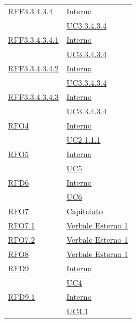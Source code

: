 \begin{longtable}{|>{\centering}m{5cm}|m{5cm}<{\centering}|}
\hyperlink{RFF3.3.4.3.4}{RFF3.3.4.3.4} & \hyperlink{Interno}{Interno}\\
& \hyperref[UC3.3.4.3.4]{UC3.3.4.3.4}\\ \hline

\hyperlink{RFF3.3.4.3.4.1}{RFF3.3.4.3.4.1} & \hyperlink{Interno}{Interno}\\
& \hyperref[UC3.3.4.3.4]{UC3.3.4.3.4}\\ \hline

\hyperlink{RFF3.3.4.3.4.2}{RFF3.3.4.3.4.2} & \hyperlink{Interno}{Interno}\\
& \hyperref[UC3.3.4.3.4]{UC3.3.4.3.4}\\ \hline

\hyperlink{RFF3.3.4.3.4.3}{RFF3.3.4.3.4.3} & \hyperlink{Interno}{Interno}\\
& \hyperref[UC3.3.4.3.4]{UC3.3.4.3.4}\\ \hline

\hyperlink{RFO4}{RFO4} & \hyperlink{Interno}{Interno}\\
& \hyperref[UC2.1.1.1]{UC2.1.1.1}\\ \hline

\hyperlink{RFO5}{RFO5} & \hyperlink{Interno}{Interno}\\
& \hyperref[UC5]{UC5}\\ \hline

\hyperlink{RFD6}{RFD6} & \hyperlink{Interno}{Interno}\\
& \hyperref[UC6]{UC6}\\ \hline

\hyperlink{RFO7}{RFO7} & \hyperlink{Capitolato}{Capitolato}\\ \hline

\hyperlink{RFO7.1}{RFO7.1} & \hyperlink{Verbale Esterno 1}{Verbale Esterno 1}\\ \hline

\hyperlink{RFO7.2}{RFO7.2} & \hyperlink{Verbale Esterno 1}{Verbale Esterno 1}\\ \hline

\hyperlink{RFO8}{RFO8} & \hyperlink{Verbale Esterno 1}{Verbale Esterno 1}\\ \hline

\hyperlink{RFD9}{RFD9} & \hyperlink{Interno}{Interno}\\
& \hyperref[UC4]{UC4}\\ \hline

\hyperlink{RFD9.1}{RFD9.1} & \hyperlink{Interno}{Interno}\\
& \hyperref[UC4.1]{UC4.1}\\ \hline


\end{longtable}
